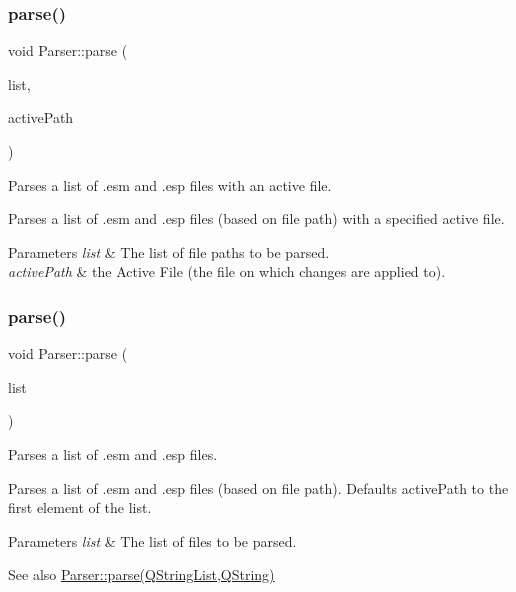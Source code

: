 \subsubsection{\texorpdfstring{parse()}{parse()}\hspace{0.1cm}{\footnotesize\ttfamily [1/2]}}
{\footnotesize\ttfamily void Parser\+::parse (\begin{DoxyParamCaption}\item[{Q\+String\+List}]{list,  }\item[{Q\+String}]{active\+Path }\end{DoxyParamCaption})\hspace{0.3cm}{\ttfamily [static]}}



Parses a list of .esm and .esp files with an active file. 

Parses a list of .esm and .esp files (based on file path) with a specified active file. 
\begin{DoxyParams}{Parameters}
{\em list} & The list of file paths to be parsed. \\
\hline
{\em active\+Path} & the Active File (the file on which changes are applied to). \\
\hline
\end{DoxyParams}
\mbox{\label{class_parser_abf10b1eb4aaf0193156a85aa25021260}} 
\subsubsection{\texorpdfstring{parse()}{parse()}\hspace{0.1cm}{\footnotesize\ttfamily [2/2]}}
{\footnotesize\ttfamily void Parser\+::parse (\begin{DoxyParamCaption}\item[{Q\+String\+List}]{list }\end{DoxyParamCaption})\hspace{0.3cm}{\ttfamily [static]}}



Parses a list of .esm and .esp files. 

Parses a list of .esm and .esp files (based on file path). Defaults active\+Path to the first element of the list. 
\begin{DoxyParams}{Parameters}
{\em list} & The list of files to be parsed. \\
\hline
\end{DoxyParams}
\begin{DoxySeeAlso}{See also}
\hyperlink{class_parser_a10507a1aecb4a2c548b64060757686ba}{Parser\+::parse(\+Q\+String\+List,\+Q\+String)} 
\end{DoxySeeAlso}
\mbox{\label{class_parser_a0db251c57832be6f327d9749bed7a0f7}} 
